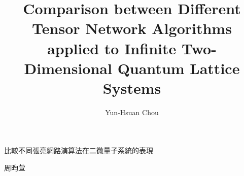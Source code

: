 

\title{Comparison between Different Tensor Network Algorithms applied to Infinite Two-Dimensional Quantum Lattice Systems}{比較不同張亮網路演算法在二微量子系統的表現}
\author{Yun-Hsuan Chou}{周昀萱}
